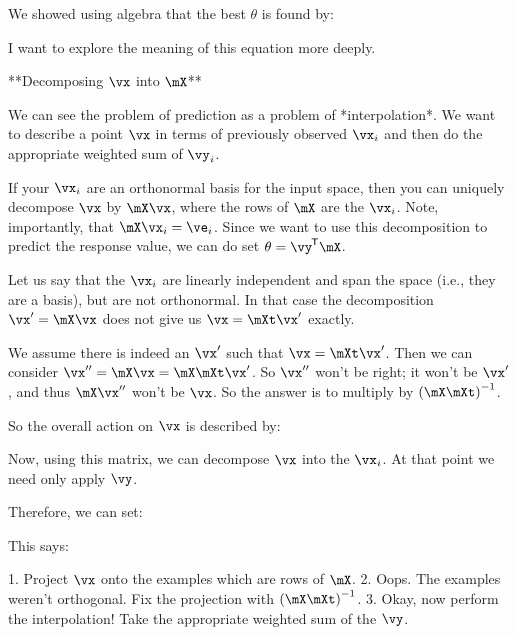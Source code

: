 We showed using algebra that the best $\theta$ is found by:

\begin{nedqn}
  \parensinv{\mXt \mX} \mXt \vy
\end{nedqn}

I want to explore the meaning of this equation more deeply.

**Decomposing $\vx$ into $\mX$**

We can see the problem of prediction as a problem of
*interpolation*. We want to describe a point $\vx$ in terms of
previously observed $\vx_i$ and then do the appropriate weighted sum of
$\vy_i$.

If your $\vx_i$ are an orthonormal basis for the input space, then you
can uniquely decompose $\vx$ by $\mX\vx$, where the rows of $\mX$ are
the $\vx_i$. Note, importantly, that $\mX\vx_i=\ve_i$. Since we want to
use this decomposition to predict the response value, we can do set
$\theta = \vyt \mX$.

Let us say that the $\vx_i$ are linearly independent and span the space
(i.e., they are a basis), but are not orthonormal. In that case the
decomposition $\vx' = \mX\vx$ does not give us $\vx = \mXt \vx'$
exactly.

We assume there is indeed an $\vx'$ such that $\vx = \mXt \vx'$. Then we
can consider $\vx'' = \mX\vx = \mX \mXt \vx'$. So $\vx''$ won't be
right; it won't be $\vx'$, and thus $\mX\vx''$ won't be $\vx$. So the
answer is to multiply by $\parensinv{\mX \mXt}$.

So the overall action on $\vx$ is described by:

\begin{nedqn}
  \parensinv{\mX \mXt} \mX
\end{nedqn}

Now, using this matrix, we can decompose $\vx$ into the $\vx_i$. At that
point we need only apply $\vy$.

\begin{nedqn}
  \hat{\vy}
\eqcol
    \vyt \parensinv{\mX \mXt} \mX\vx
\end{nedqn}

Therefore, we can set:

\begin{nedqn}
  \theta
\eqcol
    \vyt \parensinv{\mX \mXt} \mX
\end{nedqn}

This says:

1. Project $\vx$ onto the examples which are rows of $\mX$.
2. Oops. The examples weren't orthogonal. Fix the projection with
   $\parensinv{\mX \mXt}$.
3. Okay, now perform the interpolation! Take the appropriate weighted
   sum of the $\vy$.

